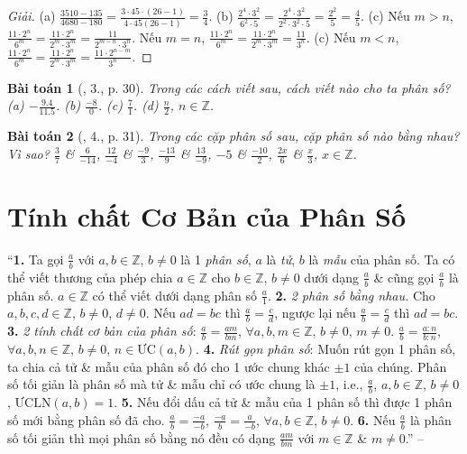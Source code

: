 \documentclass{article}
\newtheorem{baitoan}{Bài toán}
\begin{document}
\begin{proof}[Giải]
	(a) $\frac{3510 - 135}{4680 - 180} = \frac{3\cdot45\cdot(26 - 1)}{4\cdot45(26 - 1)} = \frac{3}{4}$. (b) $\frac{2^4\cdot3^2}{6^2\cdot5} = \frac{2^4\cdot3^2}{2^2\cdot3^2\cdot5} = \frac{2^2}{5} = \frac{4}{5}$. (c) Nếu $m > n$, $\frac{11\cdot2^n}{6^m} = \frac{11\cdot2^n}{2^m\cdot3^m} = \frac{11}{2^{m-n}\cdot3^n}$. Nếu $m = n$, $\frac{11\cdot2^n}{6^m} = \frac{11\cdot2^n}{2^m\cdot3^m} = \frac{11}{3^n}$. (c) Nếu $m < n$, $\frac{11\cdot2^n}{6^m} = \frac{11\cdot2^n}{2^m\cdot3^m} = \frac{11\cdot2^{n-m}}{3^n}$.
\end{proof}

\begin{baitoan}[\cite{SBT_Toan_6_Canh_Dieu_tap_2}, 3., p. 30]
	Trong các cách viết sau, cách viết nào cho ta phân số? (a) $-\frac{9.4}{11.5}$. (b) $\frac{-8}{0}$. (c) $\frac{7}{1}$. (d) $\frac{n}{2}$, $n\in\mathbb{Z}$.
\end{baitoan}

\begin{baitoan}[\cite{SBT_Toan_6_Canh_Dieu_tap_2}, 4., p. 31]
	Trong các cặp phân số sau, cặp phân số nào bằng nhau? Vì sao? $\frac{3}{7}$ \& $\frac{6}{-14}$, $\frac{12}{-4}$ \& $\frac{-9}{3}$, $\frac{-13}{9}$ \& $\frac{13}{-9}$, $-5$ \& $\frac{-10}{2}$, $\frac{2x}{6}$ \& $\frac{x}{3}$, $x\in\mathbb{Z}$.
\end{baitoan}


\section{Tính chất Cơ Bản của Phân Số}
``\textbf{1.} Ta gọi $\frac{a}{b}$ với $a,b\in\mathbb{Z}$, $b\ne0$ là 1 \textit{phân số}, $a$ là \textit{tử}, $b$ là \textit{mẫu} của phân số. Ta có thể viết thương của phép chia $a\in\mathbb{Z}$ cho $b\in\mathbb{Z}$, $b\ne 0$ dưới dạng $\frac{a}{b}$ \& cũng gọi $\frac{a}{b}$ là phân số. $a\in\mathbb{Z}$ có thể viết dưới dạng phân số $\frac{a}{1}$. \textbf{2.} \textit{2 phân số bằng nhau.} Cho $a,b,c,d\in\mathbb{Z}$, $b\ne0$, $d\ne 0$. Nếu $ad = bc$ thì $\frac{a}{b} = \frac{c}{d}$, ngược lại nếu $\frac{a}{b} = \frac{c}{d}$ thì $ad = bc$. \textbf{3.} \textit{2 tính chất cơ bản của phân số}: $\frac{a}{b} = \frac{am}{bm}$, $\forall a,b,m\in\mathbb{Z}$, $b\ne0$, $m\ne0$. $\frac{a}{b} = \frac{a:n}{b:n}$, $\forall a,b,n\in\mathbb{Z}$, $b\ne0$, $n\in\mbox{ƯC}(a,b)$. \textbf{4.} \textit{Rút gọn phân số}: Muốn rút gọn 1 phân số, ta chia cả tử \& mẫu của phân số đó cho 1 ước chung khác $\pm1$ của chúng. Phân số tối giản là phân số mà tử \& mẫu chỉ có ước chung là $\pm1$, i.e., $\frac{a}{b}$, $a,b\in\mathbb{Z}$, $b\ne0$, $\mbox{ƯCLN}(a,b) = 1$. \textbf{5.} Nếu đổi dấu cả tử \& mẫu của 1 phân số thì được 1 phân số mới bằng phân số đã cho. $\frac{a}{b} = \frac{-a}{-b}$, $\frac{-a}{b} = \frac{a}{-b}$, $\forall a,b\in\mathbb{Z}$, $b\ne0$. \textbf{6.} Nếu $\frac{a}{b}$ là phân số tối giản thì mọi phân số bằng nó đều có dạng $\frac{am}{bm}$ với $m\in\mathbb{Z}$ \& $m\ne0$.'' -- \cite[Chap. 3, \S1, p. 45]{Tuyen_Toan_6}
\end{document}
